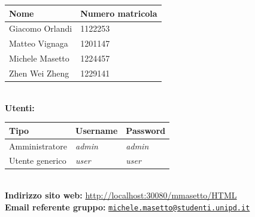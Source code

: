 \begin{center}
	\bigskip
	\begin{tabular}{| C{4.5cm} | C{4.5cm} |}
		\hline
		\textbf{Nome} & \textbf{Numero matricola}\\
		\hline
		Giacomo Orlandi & 1122253\\
		Matteo Vignaga & 1201147\\
		Michele Masetto & 1224457\\
		Zhen Wei Zheng & 1229141\\
		\hline
	\end{tabular}\\
	\bigskip
	\bigskip
	\textbf{Utenti:}\\
	\bigskip
	\begin{tabular}{| C{2.9cm} | C{2.9cm} | C{2.9cm} |}
		\hline
		\textbf{Tipo} & \textbf{Username} & \textbf{Password}\\
		\hline
		Amministratore & \textit{admin} & \textit{admin}\\
		Utente generico & \textit{user} & \textit{user}\\
		\hline
	\end{tabular}\\
	\vfill
	\textbf{Indirizzo sito web:}  \url{http://localhost:30080/mmasetto/HTML}\\
	\textbf{Email referente gruppo:}
	\texttt{\href{mailto:michele.masetto@studenti.unipd.it}{michele.masetto@studenti.unipd.it}}\\
	\vspace{0.75cm}
\end{center}